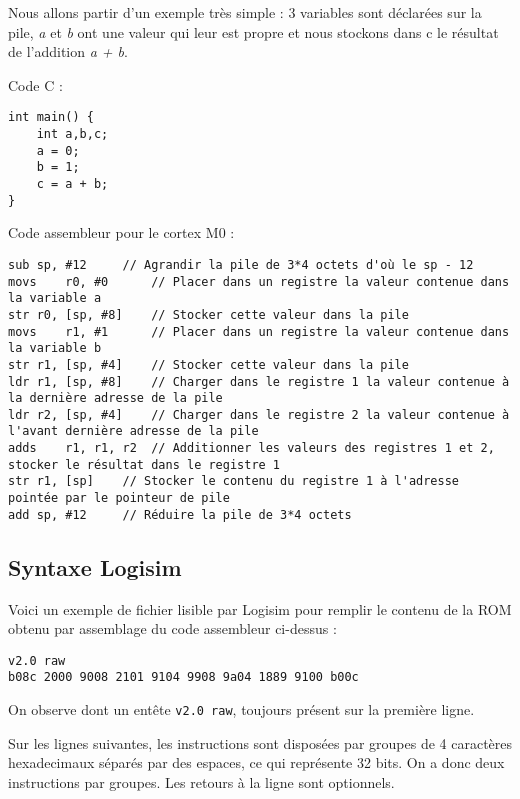 Nous allons partir d'un exemple très simple : 3 variables sont déclarées sur la pile, \textit{a} et \textit{b} ont une valeur qui leur est propre et nous stockons dans c le résultat de l'addition \textit{a + b}.
\newline 
{}
\begin{minipage}{\linewidth}
Code C :
\begin{lstlisting}
int main() {
	int a,b,c;
	a = 0;
	b = 1;
	c = a + b;
}
\end{lstlisting}
\end{minipage}
\begin{center}
\begin{minipage}{\linewidth}
Code assembleur pour le cortex M0 :
\begin{lstlisting}
sub	sp, #12 	// Agrandir la pile de 3*4 octets d'où le sp - 12
movs	r0, #0 		// Placer dans un registre la valeur contenue dans la variable a 
str	r0, [sp, #8]	// Stocker cette valeur dans la pile
movs	r1, #1		// Placer dans un registre la valeur contenue dans la variable b 
str	r1, [sp, #4]	// Stocker cette valeur dans la pile
ldr	r1, [sp, #8]	// Charger dans le registre 1 la valeur contenue à la dernière adresse de la pile
ldr	r2, [sp, #4]	// Charger dans le registre 2 la valeur contenue à l'avant dernière adresse de la pile
adds	r1, r1, r2	// Additionner les valeurs des registres 1 et 2, stocker le résultat dans le registre 1
str	r1, [sp]	// Stocker le contenu du registre 1 à l'adresse pointée par le pointeur de pile
add	sp, #12		// Réduire la pile de 3*4 octets
\end{lstlisting}
\end{minipage}
\end{center}

\subsection{Syntaxe Logisim}

Voici un exemple de fichier lisible par Logisim pour remplir le contenu de la ROM obtenu par assemblage du code assembleur ci-dessus :
\begin{lstlisting}
v2.0 raw
b08c 2000 9008 2101 9104 9908 9a04 1889 9100 b00c 
\end{lstlisting}

On observe dont un entête \texttt{v2.0 raw}, toujours présent sur la première ligne.

Sur les lignes suivantes, les instructions sont disposées par groupes de 4 caractères hexadecimaux séparés par des espaces, ce qui représente 32 bits. On a donc deux instructions par groupes. Les retours à la ligne sont optionnels.
